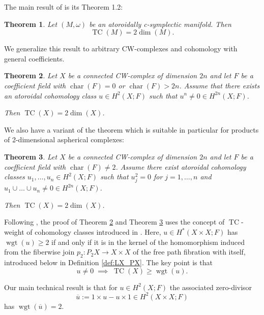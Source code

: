 \documentclass[a4paper,twoside]{article}
\theoremstyle{plain}
\newtheorem{theorem}{Theorem}[section]
\theoremstyle{definition}
\theoremstyle{remark}
\DeclareMathOperator{\characteristic}{char}
\DeclareMathOperator{\TC}{TC}
\DeclareMathOperator{\wgt}{wgt}
\begin{document}
The main result of \cite{GrantMescher} is its Theorem 1.2:
\begin{theorem}
  Let $(M,\omega)$ be an atoroidally c-symplectic manifold. Then
  \begin{equation*}
    \TC(M)= 2\dim(M).
  \end{equation*}
\end{theorem}

We generalize this result to arbitrary CW-complexes and cohomology with
general coefficients.


\begin{theorem}\label{theo:main}
  Let $X$ be a connected CW-complex of dimension $2n$ and let $F$ be a
  coefficient field with $\characteristic(F)=0$ or
  $\characteristic(F)>2n$. Assume that 
  there exists an atoroidal cohomology class
  $u\in H^2(X;F)$ such that $u^n \ne 0 \in
  H^{2n}(X;F)$.

  Then  $\TC(X) = 2\dim(X)$.
\end{theorem}

We also have a variant of the theorem which is suitable in particular for
products of 2-dimensional aspherical complexes:
\begin{theorem}\label{theo:specialmain}
  Let $X$ be a connected CW-complex of dimension $2n$ and let $F$ be a coefficient field with
  $\characteristic(F)\ne 2$. Assume there exist atoroidal cohomology classes $u_1,\dots,u_n\in H^2(X;F)$ such
  that $u_j^2=0$ for $j=1,\dots,n$ and $u_1\cup\dots\cup u_n\ne 0\in
  H^{2n}(X;F)$.

  Then  $\TC(X)=2\dim(X)$.
\end{theorem}


Following \cite{GrantMescher}, the proof of Theorem \ref{theo:main} and
Theorem \ref{theo:specialmain} uses the
concept of $\TC$-weight of cohomology classes introduced in
\cite{FarberGrant}. Here, $u\in H^*(X\times X;F)$ has $\wgt(u)\ge 2$ if and
only if it is in the kernel of the homomorphism induced from the fiberwise join
$p_2\colon P_2X\to X\times X$ of the free path fibration with itself,
introduced below in Definition \ref{def:LX_PX}. The key
point is that
\begin{equation*}
  u\ne 0\; \implies \;\TC(X)\ge \wgt(u).
\end{equation*}

Our main technical result is that for $u\in H^2(X;F)$ the associated
zero-divisor
\begin{equation*}
  \overline u:= 1\times u-u\times 1\in H^2(X\times X; F)
\end{equation*}
has
$\wgt(\overline u)=2$.
\end{document}
